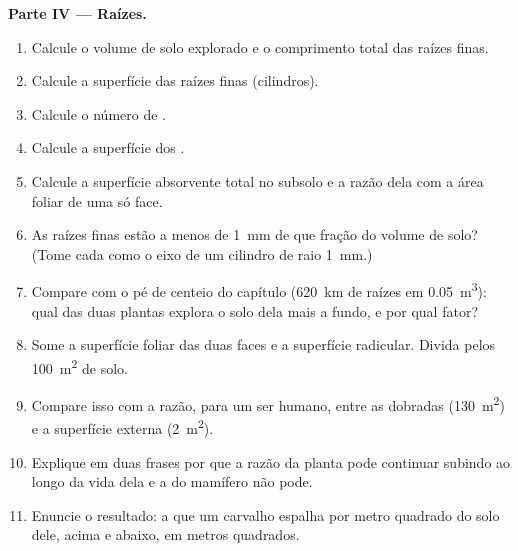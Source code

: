 \begin{problem}
\medskip
\noindent\textbf{Parte IV --- Raízes.}
\begin{enumerate}[resume]
  \item Calcule o volume de solo explorado e o comprimento total das
        raízes finas.
  \item Calcule a superfície das raízes finas (cilindros).
  \item Calcule o número de .
  \item Calcule a superfície dos .
  \item Calcule a superfície absorvente total no subsolo e a razão dela
        com a área foliar de uma só face.
  \item As raízes finas estão a menos de \qty{1}{mm} de que fração do
        volume de solo? (Tome cada  como o eixo de um cilindro de
        raio \qty{1}{mm}.)
  \item Compare com o pé de centeio do capítulo (\qty{620}{km} de raízes
        em \qty{0.05}{m^3}): qual das duas plantas explora o solo dela
        mais a fundo, e por qual fator?
  \item Some a superfície foliar das duas faces e a superfície
        radicular. Divida pelos \qty{100}{m^2} de solo.
  \item Compare isso com a razão, para um ser humano, entre as
         dobradas (\qty{130}{m^2}) e a superfície
        externa (\qty{2}{m^2}).
  \item Explique em duas frases por que a razão da planta pode continuar
        subindo ao longo da vida dela e a do mamífero não pode.
  \item Enuncie o resultado: a  que um carvalho
        espalha por metro quadrado do solo dele, acima e abaixo, em
        metros quadrados.
\end{enumerate}
\end{problem}
